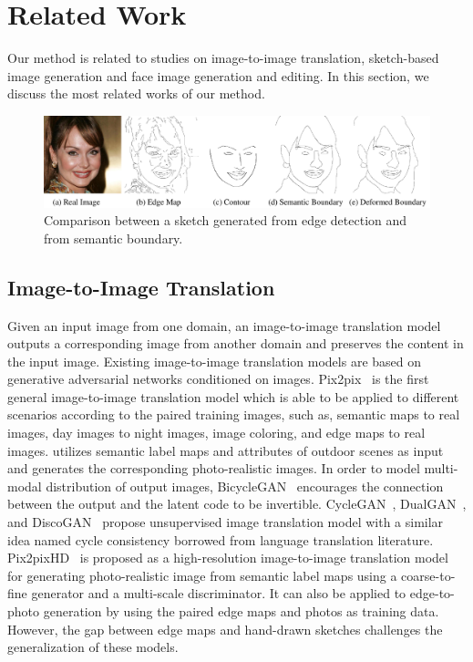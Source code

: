 \section{Related Work}
Our method is related to studies on image-to-image translation, sketch-based image generation and face image generation and editing.
In this section, we discuss the most related works of our method. 

\begin{figure}
	\centering
	\includegraphics[width=\columnwidth]{figs/data}
	\caption{Comparison between a sketch generated from edge detection and from semantic boundary.}
	\label{fig:sketch_data}
\end{figure}

\subsection{Image-to-Image Translation}
Given an input image from one domain, an image-to-image translation model outputs a corresponding image from another domain and preserves the content in the input image. Existing image-to-image translation models are based on generative adversarial networks conditioned on images. 
%
Pix2pix~\cite{pix2pix} is the first general image-to-image translation model which is able to be applied to different scenarios according to the paired training images, such as, semantic maps to real images, day images to night images, image coloring, and edge maps to real images. 
%
\cite{outdoor_scene} utilizes semantic label maps and attributes of outdoor scenes as input and generates the corresponding photo-realistic images.
%
In order to model multi-modal distribution of output images, BicycleGAN~\cite{BicycleGAN} encourages the connection between the output and the latent code to be invertible.
%
CycleGAN~\cite{CycleGAN}, DualGAN~\cite{DualGAN}, and DiscoGAN~\cite{DiscoGAN} propose unsupervised image translation model with a similar idea named cycle consistency borrowed from language translation literature. 
%
Pix2pixHD~\cite{pix2pixHD} is proposed as a high-resolution image-to-image translation model for generating photo-realistic image from semantic label maps using a coarse-to-fine generator and a multi-scale discriminator. It can also be applied to edge-to-photo generation by using the paired edge maps and photos as training data.
%
However, the gap between edge maps and hand-drawn sketches challenges the generalization of these models.

